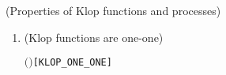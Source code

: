 \begin{proposition}{(Properties of Klop functions and processes)}
\begin{enumerate}
\begin{alltt}
\HOLTokenTurnstile{}  \HOLSymConst{\HOLTokenLt{}}  \HOLSymConst{\HOLTokenImp{}} \HOLSymConst{\HOLTokenNeg{}}\ensuremath{(}   \HOLSymConst{\HOLTokenWeakEQ}   \ensuremath{)}\hfill{[KLOP_PROP2']}
\end{alltt}
\item (Klop functions are one-one)
\begin{alltt}
\HOLTokenTurnstile{}  \ensuremath{(} \ensuremath{)}\hfill{[KLOP_ONE_ONE]}
\end{alltt}
\end{enumerate}
\end{proposition}

